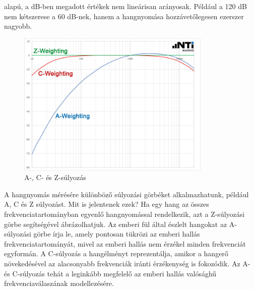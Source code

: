 alapú, a dB-ben megadott értékek nem lineárisan arányosak. Például a 120 dB nem kétszerese 
a 60 dB-nek, hanem a hangnyomása hozzávetőlegesen ezerszer nagyobb. 
\begin{figure}[H]
	\centering
	\includegraphics[width=350px, keepaspectratio]{figures/db_weights.jpg}
    \caption{A-, C- és Z-súlyozás~\cite{DBWEIGHTS}}\label{fig:db_weights}
\end{figure}
A hangnyomás mérésére különböző súlyozási görbéket alkalmazhatunk, például A, C és Z súlyozást. Mit is jelentenek 
ezek? Ha egy hang az összes frekvenciatartományban egyenlő hangnyomással rendelkezik, azt a 
Z-súlyozási görbe segítségével ábrázolhatjuk. Az emberi fül által észlelt hangokat az 
A-súlyozási görbe írja le, amely pontosan tükrözi az emberi hallás frekvenciatartományát, mivel 
az emberi hallás nem érzékel minden frekvenciát egyformán. A C-súlyozás a hangélményt 
reprezentálja, amikor a hangerő növekedésével az alacsonyabb frekvenciák iránti érzékenység is 
fokozódik. Az A- és C-súlyozás tehát a leginkább megfelelő az emberi hallás valósághű 
frekvenciaválaszának modellezésére.

\newpage
